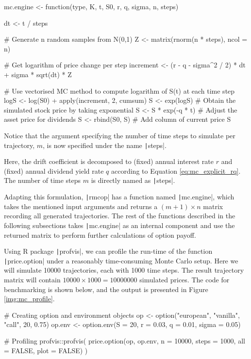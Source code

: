 \begin{Rminted}
mc.engine <- function(type, K, t, S0, r, q, sigma, n, steps) {

    dt <- t / steps

    # Generate n random samples from N(0,1)
    Z <- matrix(rnorm(n * steps), ncol = n)

    # Get logarithm of price change per step
    increment <- (r - q - sigma^2 / 2) * dt + sigma * sqrt(dt) * Z

    # Use vectorised MC method to compute logarithm of S(t) at each time step
    logS <- log(S0) + apply(increment, 2, cumsum)
    S <- exp(logS) # Obtain the simulated stock price by taking exponential
    S <- S * exp(-q * t) # Adjust the asset price for dividends
    S <- rbind(S0, S) # Add column of current price
    S
}
\end{Rminted}

Notice that the argument specifying the number of time steps to simulate per trajectory, $m$, is now specified under the name \texttt|steps|.

Here, the drift coefficient is decomposed to (fixed) annual interest rate $r$ and (fixed) annual dividend yield rate $q$ according to Equation \ref{eq:mc_explicit_rq}. The number of time steps $m$ is directly named as \texttt|steps|.

Adapting this formulation, \texttt|rmcop| has a function named \texttt|mc.engine|, which takes the mentioned input arguments and returns a $(m+1)\times n$ matrix recording all generated trajectories. The rest of the functions described in the following subsections takes \texttt|mc.engine| as an internal component and use the returned matrix to perform further calculations of option payoff.

Using R package \texttt|profvis|, we can profile the run-time of the function \texttt|price.option| under a reasonably time-consuming Monte Carlo setup. Here we will simulate 10000 trajectories, each with 1000 time steps. The result trajectory matrix will contain $10000\times1000=10000000$ simulated prices. The code for benchmarking is shown below, and the output is presented in Figure \ref{img:mc_profile}.

\begin{Rminted}
# Creating option and environment objects
op <- option("european", "vanilla", "call", 20, 0.75)
op.env <- option.env(S = 20, r = 0.03, q = 0.01, sigma = 0.05)

# Profiling
profvis::profvis(
    price.option(op, op.env, n = 10000, steps = 1000, all = FALSE, plot = FALSE)
)
\end{Rminted}

